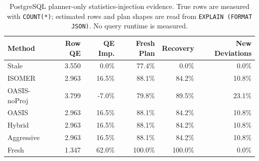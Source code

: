\begin{table}[t]
  \centering
  \small
  \caption{PostgreSQL planner-only statistics-injection evidence. True rows are measured with \texttt{COUNT(*)}; estimated rows and plan shapes are read from \texttt{EXPLAIN (FORMAT JSON)}. No query runtime is measured.}
  \label{tab:postgres_planner_stats_injection}
  \setlength{\tabcolsep}{4pt}
  \begin{tabular}{lrrrrr}
    \toprule
    Method & Row QE & QE Imp. & Fresh Plan & Recovery & New Deviations \\
    \midrule
    Stale & 3.550 & 0.0\% & 77.4\% & 0.0\% & 0.0\% \\
    ISOMER & 2.963 & 16.5\% & 88.1\% & 84.2\% & 10.8\% \\
    OASIS-noProj & 3.799 & -7.0\% & 79.8\% & 89.5\% & 23.1\% \\
    OASIS & 2.963 & 16.5\% & 88.1\% & 84.2\% & 10.8\% \\
    Hybrid & 2.963 & 16.5\% & 88.1\% & 84.2\% & 10.8\% \\
    Aggressive & 2.963 & 16.5\% & 88.1\% & 84.2\% & 10.8\% \\
    Fresh & 1.347 & 62.0\% & 100.0\% & 100.0\% & 0.0\% \\
    \bottomrule
  \end{tabular}
\end{table}
